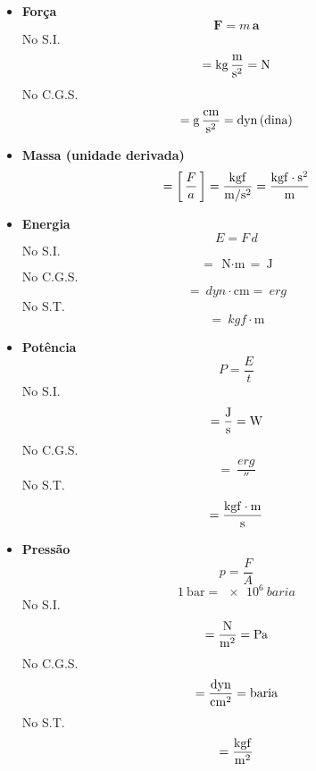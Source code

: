 \documentclass[
	a4paper, 
	12pt, 
	brazilian
]{article}
\begin{document}
	\begin{itemize}
		\item\textbf{Força}
		\begin{equation}
			\bm{F}=m\,\bm{a}
		\end{equation}
		No S.I.
		\begin{equation}
			[\,F\,]=\SI{}{\kilogram\,\dfrac{\meter}{\second^{2}}}=\SI{}{\newton}
		\end{equation}
		No C.G.S.
		\begin{equation}
			[\,F\,]=\SI{}{\gram\,\dfrac{\centi\meter}{\second^{2}}}=\SI{}{dyn\,(dina)}
		\end{equation}
		\item\textbf{Massa (unidade derivada)}
		\begin{equation}
			[\,m\,]=\left[\,\dfrac{F}{a}\,\right]=\dfrac{\SI{}{kgf}}{\SI{}{\meter/\second^{2}}}=\SI{}{\dfrac{kgf\cdot\second^{2}}{\meter}}
		\end{equation}
		\item\textbf{Energia}
		\begin{equation}
			E=F\,d
		\end{equation}
		No S.I.
		\begin{equation}
			[\,E\,]=\SI{}{\newton\cdot\meter}=\SI{}{\joule}
		\end{equation}
		No C.G.S.
		\begin{equation}
			[\,E\,]=\SI{}{dyn\cdot\centi\meter}=\SI{}{erg}
		\end{equation}
		No S.T.
		\begin{equation}
			[\,E\,]=\SI{}{kgf\cdot\meter}
		\end{equation}
		\item\textbf{Potência}
		\begin{equation}
			P=\dfrac{E}{t}
		\end{equation}
		No S.I.
		\begin{equation}
			[\,P\,]=\SI{}{\dfrac{\joule}{\second}}=\SI{}{\watt}
		\end{equation}
		No C.G.S.
		\begin{equation}
			[\,P\,]=\SI{}{\dfrac{erg}{\second}}
		\end{equation}
		No S.T.
		\begin{equation}
			[\,P\,]=\SI{}{\dfrac{kgf\cdot\meter}{\second}}
		\end{equation}
		\item\textbf{Pressão}
		\begin{equation}
			p=\dfrac{F}{A}
		\end{equation}
		\begin{equation}
			\SI{1}{\bar}=\SI{e6}{baria}
		\end{equation}
		No S.I.
		\begin{equation}
			[\,p\,]=\SI{}{\dfrac{\newton}{\meter^{2}}}=\SI{}{\pascal}
		\end{equation}
		No C.G.S.
		\begin{equation}
			[\,p\,]=\SI{}{\dfrac{dyn}{\centi\meter^{2}}}=\SI{}{baria}
		\end{equation}
		No S.T.
		\begin{equation}
			[\,p\,]=\SI{}{\dfrac{kgf}{\meter^{2}}}
		\end{equation}
	\end{itemize}
\end{document}
